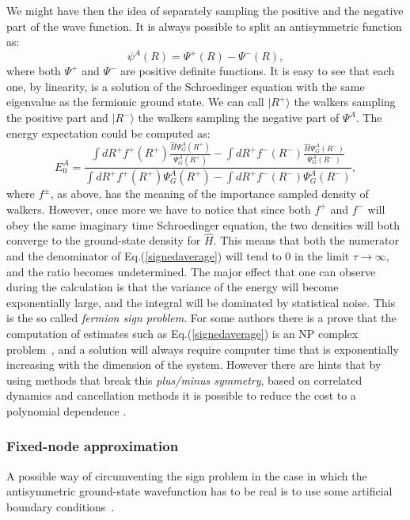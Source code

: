 We might have then the idea of separately sampling the positive and the negative part of the wave function. It is always possible to split an antisymmetric function as:
\begin{equation}
\psi^A(R)=\Psi^+(R)-\Psi^-(R),
\end{equation}
where both $\Psi^+$ and $\Psi^-$ are positive definite functions. It is easy to see that each one, by linearity, is a solution of the Schroedinger equation with the same eigenvalue as the fermionic ground state. We can call $|R^+\rangle$ the walkers sampling the positive part and $|R^-\rangle$ the walkers sampling the negative part of $\Psi^A$. The energy expectation could be computed as:
\begin{equation}
E_0^A=\frac{\displaystyle\int dR^+ f^{+}(R^+)\frac{\hat{H}\Psi_G^A(R^+)}{\Psi_G^A(R^+)}-\int dR^+ f^{-}(R^-)\frac{\hat{H}\Psi_G^A(R^-)}{\Psi_G^A(R^-)}}{\displaystyle
 \int dR^+ f^+(R^+)\Psi_G^A(R^+)-\int dR^+ f^-(R^-)\Psi_G^A(R^-)},\label{signedaverage}
\end{equation}
where $f^\pm$, as above, has the meaning of the importance sampled density of walkers. However, once more we have to notice that since both $f^+$ and $f^-$ will obey the same imaginary time Schroedinger equation, the two densities will both converge to the ground-state density for $\hat{H}$. This means that both the numerator and the denominator of Eq.(\ref{signedaverage}) will tend to 0 in the limit $\tau\rightarrow\infty$, and the ratio becomes undetermined.
The major effect that one can observe during the calculation is that the variance of the energy will become exponentially large, and the integral will be dominated by statistical noise. This is the so called {\it fermion sign problem}. For some authors there is a prove that the computation of estimates such as Eq.(\ref{signedaverage}) is an NP complex problem~\cite{Troyer05}, and a solution will always require computer time that is exponentially increasing with the dimension of the system. However there are hints that by using methods that break this {\it plus/minus symmetry}, based on correlated dynamics and cancellation methods it is possible to reduce the cost to a polynomial dependence \cite{Kalos00,Assaraf07}.

\subsubsection{Fixed-node approximation}
\label{sec:fn}
A possible way of circumventing the sign problem in the case in which the antisymmetric ground-state wavefunction has to be real is to use some artificial boundary conditions~\cite{Ceperley80}.

